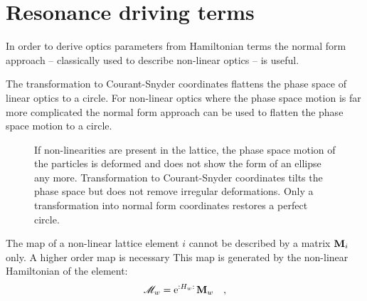 \section{Resonance driving terms}

In order to derive optics parameters from Hamiltonian terms the normal form approach
\cite{Bartolini1997,Tomas2005} -- classically
used to describe non-linear optics -- is useful. 

The transformation to Courant-Snyder coordinates flattens the phase space of linear optics to a circle.
For non-linear optics where the phase space motion is far more complicated the normal form approach
can be used to flatten the phase space motion to a circle.

\begin{figure}[h]
    \centering
    
    \hspace{1em}
    
    \hspace{1em}
    
    \caption{
      If non-linearities are present in the lattice, the phase space motion of the particles is
      deformed and does not show the form of an ellipse any more. 
      Transformation to Courant-Snyder
      coordinates tilts the phase space but does not remove irregular deformations.
      Only a transformation into normal form coordinates restores a perfect circle.
    }
    \label{fig_phase_space_ellipse_nl}
\end{figure}

The map of a non-linear lattice element $i$ cannot be described by a matrix $\mathbf{M}_i$ only.
A higher order map is necessary
This map is generated by the non-linear Hamiltonian of the element:
%
\begin{equation}
    \mathscr{M}_w = \text{e}^{{:}H_w{:}\,} \mathbf{M}_w
    \quad ,
\end{equation}
%
 
